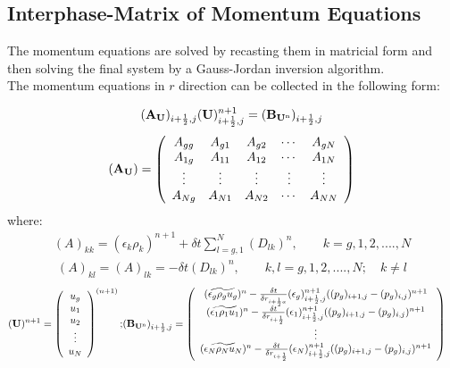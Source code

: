 \subsection{Interphase-Matrix of Momentum Equations}

The momentum equations are solved by recasting them in matricial 
form and then solving  the final system by a Gauss-Jordan inversion algorithm. \\
The momentum equations in $r$ direction can be collected in the following form:

\begin{eqnarray}
({\bf A_U})_{i+\frac{1}{2},j} ({\bf U})_{i+\frac{1}{2},j}^{n+1} = 
({\bf B_{U^{\rm n}}})_{i+\frac{1}{2},j}
\nonumber
\end{eqnarray}
%
\begin{eqnarray}
({\bf A_U}) = \left ( \begin{array}{ccccc}
A_{gg} & A_{g1} & A_{g2} & \cdots & A_{gN} \\
A_{1g} & A_{11} & A_{12} & \cdots & A_{1N} \\
\vdots  & \vdots  &   \vdots  &    \vdots &   \vdots  \\
A_{Ng} & A_{N1} & A_{N2} & \cdots & A_{NN}  \end{array} \right )
\nonumber
\end{eqnarray}
%
where:
%
\begin{eqnarray}
(A)_{kk} = (\epsilon_k \rho_k)^{n+1} + \delta t \sum_{l=g,1}^{N} (D_{lk})^{n},
\qquad  k = g,1,2,....,N
\nonumber
\end{eqnarray}
%
\begin{eqnarray}
(A)_{kl} = (A)_{lk} = - \delta t (D_{lk})^{n},
\qquad  k,l  = g,1,2,....,N; \quad k \not= l
\nonumber
\end{eqnarray}
%
\begin{eqnarray}
({\bf U})^{n+1} =
\left( \begin{array}{c}
u_g \\
u_1 \\
u_2 \\
\vdots \\
u_N \end{array} \right )^{(n+1)}; &
({\bf B_{U^{\rm n}}})_{i+\frac{1}{2},j} = 
\left( \begin{array}{c}
(\widetilde {\epsilon_g \rho_g u_g})^n - 
\frac{\delta t}{\delta r_{i+\frac{1}{2}a}} 
(\epsilon_g)_{i+\frac{1}{2},j}^{n+1} ((p_g)_{i+1,j} - (p_g)_{i,j})^{n+1}     \\
(\widetilde {\epsilon_1 \rho_1 u_1})^n - 
\frac{\delta t}{\delta r_{i+\frac{1}{2}}} 
(\epsilon_1)_{i+\frac{1}{2},j}^{n+1} ((p_g)_{i+1,j} - (p_g)_{i,j})^{n+1}     \\
\vdots        \\
(\widetilde {\epsilon_N \rho_N u_N})^n -
\frac{\delta t}{\delta r_{i+\frac{1}{2}}} 
(\epsilon_N)_{i+\frac{1}{2},j}^{n+1} ((p_g)_{i+1,j} - (p_g)_{i,j})^{n+1}
\end{array} \right )
\nonumber
\end{eqnarray}
